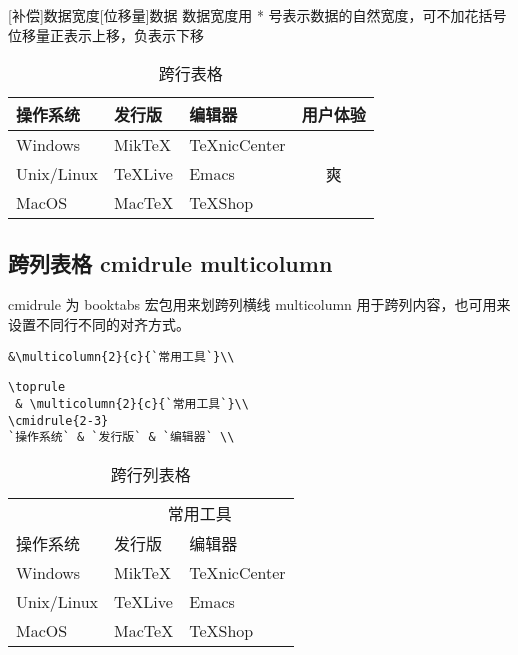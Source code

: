 \begin{latexcmd}[label= 跨行表格命令]
[补偿]{数据宽度}[位移量]{数据}
数据宽度用 * 号表示数据的自然宽度，可不加花括号
位移量正表示上移，负表示下移
\end{latexcmd}

\begin{table}[htbp]
\caption{跨行表格} \centering
\begin{tabular}{lllc}
\toprule

操作系统 & 发行版 & 编辑器 & 用户体验\\

\midrule Windows & MikTeX & TeXnicCenter&
\multirow{3}{*}{\centering 爽}\\

Unix/Linux&TeXLive&Emacs\\

MacOS&MacTeX&TeXShop\\

\bottomrule
\end{tabular}
\end{table}


\subsection{跨列表格 cmidrule multicolumn }


cmidrule 为 booktabs 宏包用来划跨列横线 multicolumn 用于跨列内容，也可用来设置不同行不同的对齐方式。


\begin{lstlisting}[language={[LaTeX]TeX}]
&\multicolumn{2}{c}{`常用工具`}\\
\end{lstlisting}

\begin{lstlisting}[language={[LaTeX]TeX}]
\toprule
 & \multicolumn{2}{c}{`常用工具`}\\
\cmidrule{2-3}
`操作系统` & `发行版` & `编辑器` \\
\end{lstlisting}


\begin{table}[htbp]
\caption{跨行列表格} \centering
\begin{tabular}{lll}
\toprule
&\multicolumn{2}{c}{常用工具}\\
\cmidrule{2-3}
操作系统 & 发行版 & 编辑器 \\
\midrule
Windows &  MikTeX & TeXnicCenter\\
Unix/Linux & TeXLive & Emacs\\
MacOS & MacTeX & TeXShop\\
\bottomrule
\end{tabular}
\end{table}

